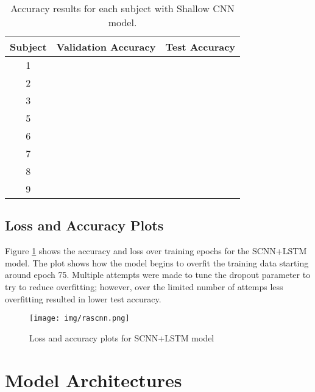 \documentclass{article}
\begin{document}
\begin{table}[ht]
\begin{center}
    \begin{tabular}{|c|c|c|}
        \hline
        Subject & Validation Accuracy   & Test Accuracy \\
        \hline\hline
        1       &   &   \\
        2       &   &   \\
        3       &   &   \\
        5       &   &   \\
        6       &   &   \\
        7       &   &   \\
        8       &   &   \\
        9       &   &   \\
        \hline
    \end{tabular}
\end{center}
\caption{Accuracy results for each subject with Shallow CNN model.}
\label{tab:subj}
\end{table}

\subsection{Loss and Accuracy Plots}
Figure \ref{fig:lstm} shows the accuracy and loss over training epochs for the
SCNN+LSTM model. The plot shows how the model begins to overfit the training
data starting around epoch 75. Multiple attempts were made to tune the dropout
parameter to try to reduce overfitting; however, over the limited number of
attemps less overfitting resulted in lower test accuracy.
\begin{figure}
    \texttt{[image: img/rascnn.png]}
    \caption{Loss and accuracy plots for SCNN+LSTM model}
    \label{fig:lstm}
\end{figure}

\section{Model Architectures}
\end{document}
